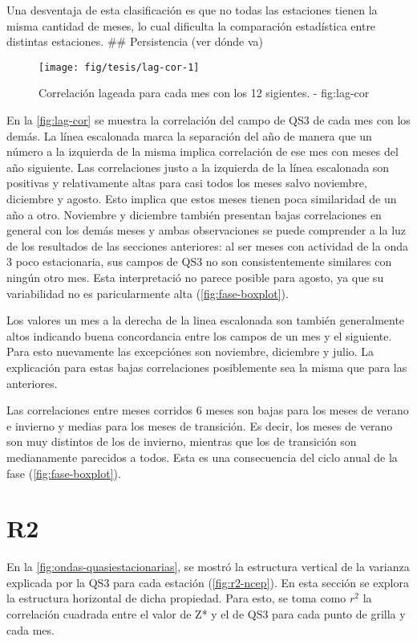 \documentclass[spanish,a4paper]{book}
\begin{document}
Una desventaja de esta clasificación es que no todas las estaciones
tienen la misma cantidad de meses, lo cual dificulta la comparación
estadística entre distintas estaciones. \#\# Persistencia (ver dónde va)

\begin{figure*}
\texttt{[image: fig/tesis/lag-cor-1]} \caption{Correlación lageada para cada mes con los 12 sigientes. - fig:lag-cor}\label{fig:lag-cor}
\end{figure*}

En la \autoref{fig:lag-cor} se muestra la correlación del campo de QS3
de cada mes con los demás. La línea escalonada marca la separación del
año de manera que un número a la izquierda de la misma implica
correlación de ese mes con meses del año siguiente. Las correlaciones
justo a la izquierda de la línea escalonada son positivas y
relativamente altas para casi todos los meses salvo noviembre, diciembre
y agosto. Esto implica que estos meses tienen poca similaridad de un año
a otro. Noviembre y diciembre también presentan bajas correlaciones en
general con los demás meses y ambas observaciones se puede comprender a
la luz de los resultados de las secciones anteriores: al ser meses con
actividad de la onda 3 poco estacionaria, sus campos de QS3 no son
consistentemente similares con ningún otro mes. Esta interpretació no
parece posible para agosto, ya que su variabilidad no es paricularmente
alta (\autoref{fig:fase-boxplot}).

Los valores un mes a la derecha de la linea escalonada son también
generalmente altos indicando buena concordancia entre los campos de un
mes y el siguiente. Para esto nuevamente las excepciónes son noviembre,
diciembre y julio. La explicación para estas bajas correlaciones
posiblemente sea la misma que para las anteriores.

Las correlaciones entre meses corridos 6 meses son bajas para los meses
de verano e invierno y medias para los meses de transición. Es decir,
los meses de verano son muy distintos de los de invierno, mientras que
los de transición son medianamente parecidos a todos. Esta es una
consecuencia del ciclo anual de la fase (\autoref{fig:fase-boxplot}).

\section{R2}\label{r2}

En la \autoref{fig:ondas-quasiestacionarias}, se mostró la estructura
vertical de la varianza explicada por la QS3 para cada estación
(\autoref{fig:r2-ncep}). En esta sección se explora la estructura
horizontal de dicha propiedad. Para esto, se toma como \(r^2\) la
correlación cuadrada entre el valor de Z* y el de QS3 para cada punto de
grilla y cada mes.
\end{document}

